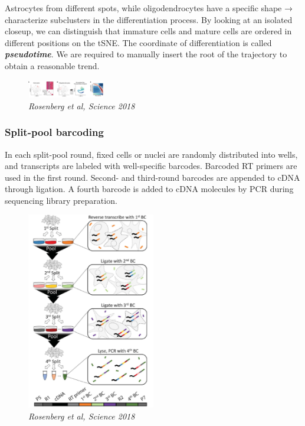 Astrocytes from different spots, while oligodendrocytes have a specific
shape → characterize subclusters in the differentiation process. By
looking at an isolated closeup, we can distinguish that immature cells
and mature cells are ordered in different positions on the tSNE. The
coordinate of differentiation is called \textbf{\emph{pseudotime}}. We
are required to manually insert the root of the trajectory to obtain a
reasonable trend.

\begin{figure}
\centering
\includegraphics[width=0.3\textwidth]{images/Screenshot_2023-03-24_at_08-21-13.png}
\caption{\emph{Rosenberg et al, Science 2018}}
\end{figure}


\hypertarget{split-pool-barcoding}{%
\subsubsection{Split-pool barcoding}\label{split-pool-barcoding}}

In each split-pool round, fixed cells or nuclei are randomly distributed
into wells, and transcripts are labeled with well-specific barcodes.
Barcoded RT primers are used in the first round. Second- and third-round
barcodes are appended to cDNA through ligation. A fourth barcode is
added to cDNA molecules by PCR during sequencing library preparation.

\begin{figure}
\centering
\includegraphics[width=0.5\textwidth]{images/Screenshot_2023-03-24_at_08-04-47.png}
\caption{\emph{Rosenberg et al, Science 2018}}
\end{figure}


